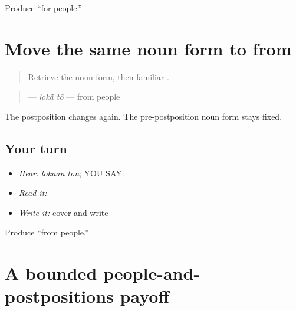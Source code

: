 \begin{tcolorbox}[breakable,colback=teal!4,colframe=teal!35!black,title={Before you move on}]
Produce “for people.”
\end{tcolorbox}
\section[\texorpdfstring{\pa{ਲੋਕਾਂ} \pa{ਤੋਂ} (lokaan ton)}{ਲੋਕਾਂ ਤੋਂ (lokaan ton)}]{Move the same noun form to from}

\label{lesson:PA-C192-lokaan-ton}



\begin{quote}
Retrieve the noun form, then familiar \textbf{}.
\end{quote}

\begin{grammarlens}[title={Grammar Lens: a third familiar postposition}]
\begin{quote}
\textbf{ } — \emph{lokā̃ tõ} — from people
\end{quote}

The postposition changes again. The pre-postposition noun form stays fixed.
\end{grammarlens}

\subsection*{Your turn}
\begin{itemize}
\raggedright
  \item \emph{Hear:} \emph{lokaan ton}; YOU SAY: \textbf{ }
  \item \emph{Read it:} \textbf{ }
  \item \emph{Write it:} cover and write \textbf{ }
\end{itemize}

\begin{tcolorbox}[breakable,colback=teal!4,colframe=teal!35!black,title={Before you move on}]
Produce “from people.”
\end{tcolorbox}
\section[\texorpdfstring{\pa{ਲੋਕ} · \pa{ਲੋਕਾਂ} \pa{ਨਾਲ} … (lok; lokaan …)}{ਲੋਕ · ਲੋਕਾਂ ਨਾਲ … (lok; lokaan …)}]{A bounded people-and-postpositions payoff}

\label{lesson:PA-C192-payoff}




